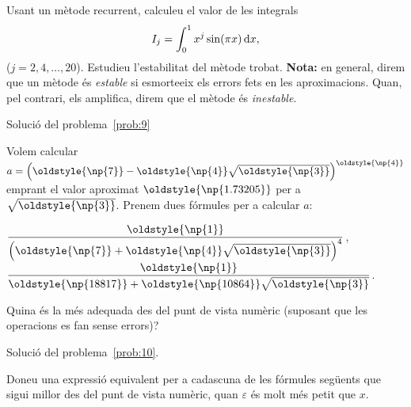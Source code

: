 \documentclass[a4paper,twoside,12pt]{exam}
\newcommand{\osnp}[1]{\oldstyle{\np{#1}}}
\begin{document}
\begin{questions}
\question\label{prob:9}
Usant un mètode recurrent, calculeu el valor de les integrals
\begin{displaymath}
	I_{j} = \int_{0}^{1} x^{j}\sin(\pi x)\,\mathrm{d} x,
\end{displaymath}
($j=2,4,\dots,20$). Estudieu l'estabilitat del mètode trobat.
\textbf{Nota:} en general, direm que un mètode és \emph{estable} si esmorteeix
els errors fets en les aproximacions. Quan, pel contrari, els amplifica, direm
que el mètode és \emph{inestable}.
\begin{solution}
	Solució del problema~\ref{prob:9}
\end{solution}

\question\label{prob:10}
Volem calcular
$a = \left(\osnp{7} - \osnp{4}\sqrt{\osnp{3}}\right)^{\osnp{4}}$
emprant el valor aproximat $\osnp{1.73205}$ per a $\sqrt{\osnp{3}}$.
Prenem dues fórmules per a calcular $a$:

\begin{oneparchoices}
	\choice $\dfrac{\osnp{1}}{\left(\osnp{7} + 
	\osnp{4}\sqrt{\osnp{3}}\right)^{4}}$, 
	\choice $\dfrac{\osnp{1}}{\osnp{18817} +\osnp{10864}
	\sqrt{\osnp{3}}}$.
\end{oneparchoices}

Quina és la més adequada des del punt de vista numèric (suposant que
les operacions es fan sense errors)?
\begin{solution}
	Solució del problema~\ref{prob:10}.
\end{solution}

\question\label{prob:11}
Doneu una expressió equivalent per a cadascuna de les fórmules següents
que sigui millor des del punt de vista numèric, quan $\varepsilon$ és
molt més petit que $x$.
\end{questions}
\end{document}

